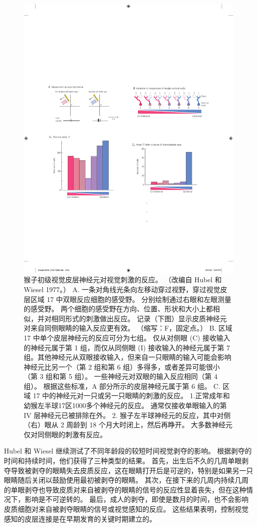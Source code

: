 \begin{figure}[htbp]
	\centering
	\includegraphics[width=0.5\linewidth]{chap49/fig_49_3}
	\caption{猴子初级视觉皮层神经元对视觉刺激的反应。 （改编自 Hubel 和 Wiesel 1977。） A. 一条对角线光条向左移动穿过视野，穿过视觉皮层区域 17 中双眼反应细胞的感受野。 分别绘制通过右眼和左眼测量的感受野。 两个细胞的感受野在方向、位置、形状和大小上都相似，并对相同形式的刺激做出反应。 记录（下图）显示皮质神经元对来自同侧眼睛的输入反应更有效。 （缩写：F，固定点。） B. 区域 17 中单个皮层神经元的反应可分为七组。 仅从对侧眼 (C) 接收输入的神经元属于第 1 组，而仅从同侧眼 (I) 接收输入的神经元属于第 7 组。其他神经元从双眼接收输入，但来自一只眼睛的输入可能会影响 神经元比另一个（第 2 组和第 6 组）多得多，或者差异可能很小（第 3 组和第 5 组）。 一些神经元对双眼的输入反应相同（第 4 组）。 根据这些标准，A 部分所示的皮层神经元属于第 6 组。 C. 区域 17 中的神经元对一只或另一只眼睛的刺激的反应。 1.正常成年和幼猴左半球17区1000多个神经元的反应。 通常仅接收单眼输入的第 IV 层神经元已被排除在外。 2. 猴子左半球神经元的反应，其中对侧（右）眼从 2 周龄到 18 个月大时闭上，然后再睁开。 大多数神经元仅对同侧眼的刺激有反应。}
	\label{fig:49_3}
\end{figure}


Hubel 和 Wiesel 继续测试了不同年龄段的较短时间视觉剥夺的影响。
根据剥夺的时间和持续时间，他们获得了三种类型的结果。
首先，出生后不久的几周单眼剥夺导致被剥夺的眼睛失去皮质反应，这在眼睛打开后是可逆的，特别是如果另一只眼睛随后关闭以鼓励使用最初被剥夺的眼睛。
其次，在接下来的几周内持续几周的单眼剥夺也导致皮质对来自被剥夺的眼睛的信号的反应性显着丧失，但在这种情况下，影响是不可逆转的。
最后，成人的剥夺，即使是数月的时间，也不会影响皮质细胞对来自被剥夺眼睛的信号或视觉感知的反应。
这些结果表明，控制视觉感知的皮层连接是在早期发育的关键时期建立的。


